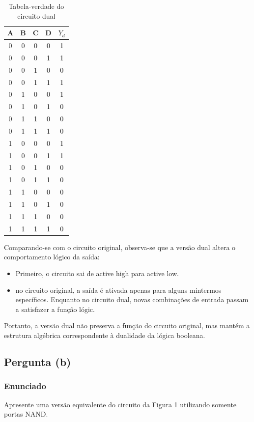 \documentclass[12pt]{article}
\begin{document}
\begin{table}[H]
\centering

\renewcommand{\arraystretch}{1.2}
\begin{tabular}{|c|c|c|c|c|}
\hline
A & B & C & D & $Y_d$ \\
\hline
0 & 0 & 0 & 0 & 1 \\
0 & 0 & 0 & 1 & 1 \\
0 & 0 & 1 & 0 & 0 \\
0 & 0 & 1 & 1 & 1 \\
0 & 1 & 0 & 0 & 1 \\
0 & 1 & 0 & 1 & 0 \\
0 & 1 & 1 & 0 & 0 \\
0 & 1 & 1 & 1 & 0 \\
1 & 0 & 0 & 0 & 1 \\
1 & 0 & 0 & 1 & 1 \\
1 & 0 & 1 & 0 & 0 \\
1 & 0 & 1 & 1 & 0 \\
1 & 1 & 0 & 0 & 0 \\
1 & 1 & 0 & 1 & 0 \\
1 & 1 & 1 & 0 & 0 \\
1 & 1 & 1 & 1 & 0 \\
\hline
\end{tabular}
\caption{Tabela-verdade do circuito dual}
\end{table}

Comparando-se com o circuito original, observa-se que a versão dual altera o comportamento lógico da saída:

\begin{itemize}
    \item Primeiro, o circuito sai de active high para active low.
    \item no circuito original, a saída é ativada apenas para alguns mintermos específicos. Enquanto no circuito dual, novas combinações de entrada passam a satisfazer a função lógic.
\end{itemize}

Portanto, a versão dual não preserva a função do circuito original, mas mantém a estrutura algébrica correspondente à dualidade da lógica booleana.

\subsection{Pergunta (b)}

\subsubsection*{Enunciado}
Apresente uma versão equivalente do circuito da Figura 1 utilizando somente portas NAND. 
\end{document}
